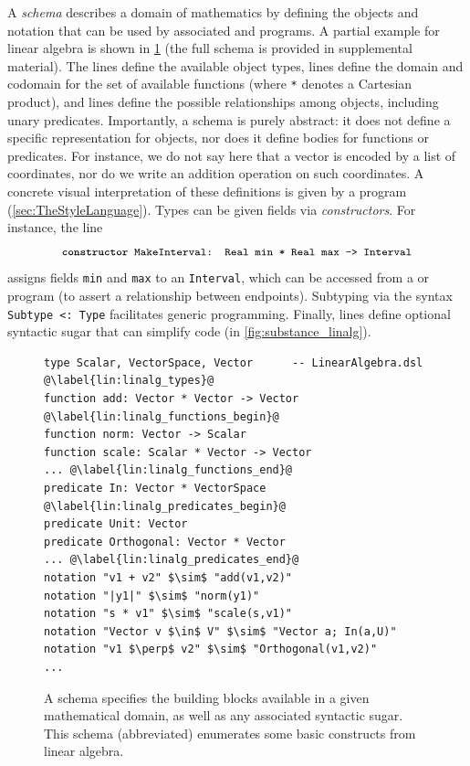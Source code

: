 A \Domain{} \emph{schema} describes a domain of mathematics by defining the objects and notation that can be used by associated \Substance{} and \Style{} programs.  A partial example for linear algebra is shown in \cref{fig:domain_linalg} (the full schema is provided in supplemental material).  The  lines define the available object types,  lines define the domain and codomain for the set of available functions (where \texttt{*} denotes a Cartesian product), and  lines define the possible relationships among objects, including unary predicates.  Importantly, a \Domain{} schema is purely abstract: it does not define a specific representation for objects, nor does it define bodies for functions or predicates. For instance, we do not say here that a vector is encoded by a list of coordinates, nor do we write an addition operation on such coordinates.  A concrete visual interpretation of these definitions is given by a \Style{} program (\cref{sec:TheStyleLanguage}).  Types can be given fields via \emph{constructors}. For instance, the line
\[
   \text{\small\texttt{\textbf{constructor} MakeInterval: Real min * Real max -> Interval}}
\]
assigns fields \texttt{min} and \texttt{max} to an \texttt{Interval}, which can be accessed from a \Substance{} or \Style{} program (\eg to assert a relationship between endpoints).  Subtyping via the syntax \texttt{Subtype <: Type} facilitates generic programming.  Finally,  lines define optional syntactic sugar that can simplify code (\eg in \cref{fig:substance_linalg}).

\begin{figure}
\begin{mdframed}[style=DSLCode]
\begin{lstlisting}[language=Elem,escapechar=@]
type Scalar, VectorSpace, Vector      -- LinearAlgebra.dsl @\label{lin:linalg_types}@
function add: Vector * Vector -> Vector @\label{lin:linalg_functions_begin}@
function norm: Vector -> Scalar
function scale: Scalar * Vector -> Vector
... @\label{lin:linalg_functions_end}@
predicate In: Vector * VectorSpace @\label{lin:linalg_predicates_begin}@
predicate Unit: Vector
predicate Orthogonal: Vector * Vector
... @\label{lin:linalg_predicates_end}@
notation "v1 + v2" $\sim$ "add(v1,v2)"
notation "|y1|" $\sim$ "norm(y1)"
notation "s * v1" $\sim$ "scale(s,v1)"
notation "Vector v $\in$ V" $\sim$ "Vector a; In(a,U)"
notation "v1 $\perp$ v2" $\sim$ "Orthogonal(v1,v2)"
...
\end{lstlisting}
\end{mdframed}
   \caption{A \Domain{} schema specifies the building blocks available in a given mathematical domain, as well as any associated syntactic sugar.  This schema (abbreviated) enumerates some basic constructs from linear algebra.\label{fig:domain_linalg}}
\end{figure}


